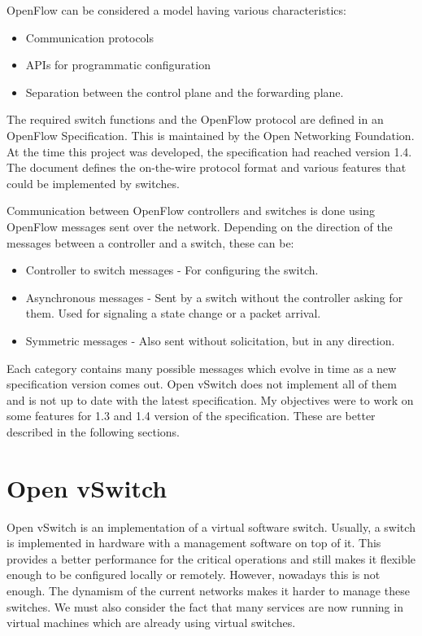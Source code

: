 OpenFlow can be considered a model\cite{sdn} having various characteristics:
\begin{itemize}
 \item Communication protocols
 \item APIs for programmatic configuration
 \item Separation between the control plane and the forwarding plane.
\end{itemize}

The required switch functions and the OpenFlow protocol are defined in an OpenFlow Specification.
This is maintained by the Open Networking Foundation\cite{onf}. At the time this project was developed, the specification
had reached version 1.4. The document defines the on-the-wire protocol format and various features that could
be implemented by switches.

Communication between OpenFlow controllers and switches is done using OpenFlow messages sent over the network.
Depending on the direction of the messages between a controller and a switch, these can be:
\begin{itemize}
 \item Controller to switch messages - For configuring the switch.
 \item Asynchronous messages - Sent by a switch without the controller asking for them. Used
 for signaling a state change or a packet arrival.
 \item Symmetric messages - Also sent without solicitation, but in any direction.
\end{itemize}

Each category contains many possible messages which evolve in time as a new specification version comes out.
Open vSwitch does not implement all of them and is not up to date with the latest specification. My objectives
were to work on some features for 1.3 and 1.4 version of the specification. These are better described in the following sections.


\section{Open vSwitch}
Open vSwitch\cite{ovs} is an implementation of a virtual software switch. Usually, a switch is implemented in hardware
with a management software on top of it. This provides a better performance for the critical operations
and still makes it flexible enough to be configured locally or remotely. However, nowadays this is not
enough. The dynamism of the current networks makes it harder to manage these switches. We must also
consider the fact that many services are now running in virtual machines which are already using
virtual switches.

